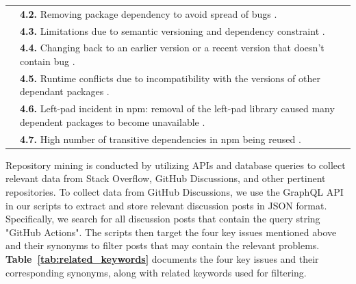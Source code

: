\documentclass[conference]{IEEEtran}
\begin{document}
\begin{table}[!t]
\begin{tabular}{|p{3cm}|p{14cm}|}
						     & \textbf{4.2.} Removing package dependency to avoid spread of bugs \cite{decan2018impact}. \\	
						     & \textbf{4.3.} Limitations due to semantic versioning and dependency constraint \cite{decan2018impact}.\\
						     & \textbf{4.4.} Changing back to an earlier version or a recent version that doesn’t contain bug \cite{decan2018impact}.\\
						     & \textbf{4.5.} Runtime conflicts due to incompatibility with
the versions of other dependant packages \cite{dietrich2019dependency}.
 \\
						     & \textbf{4.6.} Left-pad incident in npm: removal of the left-pad library caused many dependent packages to become unavailable \cite{zimmermann2019small}.  \\
						     & \textbf{4.7.} High number of transitive dependencies in npm  being reused \cite{zimmermann2019small}.  \\
        \hline
    \end{tabular}
    \end{table}
             Repository mining is conducted by utilizing APIs and database queries to collect relevant data from Stack Overflow, GitHub Discussions, and other pertinent repositories. To collect data from GitHub Discussions, we use the GraphQL API in our scripts \cite{Marof2024} to extract and store relevant discussion posts in JSON format. Specifically, we search for all discussion posts that contain the query string "GitHub Actions". The scripts then target the four key issues mentioned above and their synonyms to filter posts that may contain the relevant problems. \textbf{Table~\ref{tab:related_keywords}} documents the four key issues and their corresponding synonyms, along with related keywords used for filtering. \\
\end{document}

